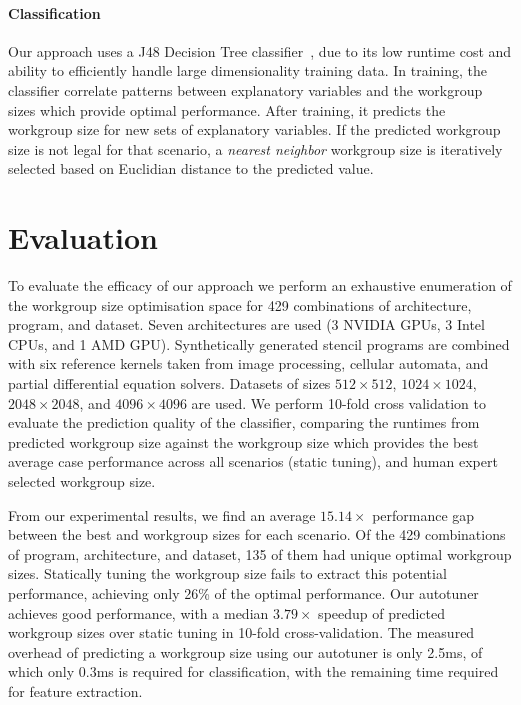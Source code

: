 \documentclass[times, 10pt,twocolumn]{article}
\begin{document}
\paragraph{Classification} Our approach uses a J48 Decision Tree
classifier~\cite{Han2011}, due to its low runtime cost and ability to
efficiently handle large dimensionality training data. In training,
the classifier correlate patterns between explanatory variables and
the workgroup sizes which provide optimal performance. After training,
it predicts the workgroup size for new sets of explanatory
variables. If the predicted workgroup size is not legal for that
scenario, a \emph{nearest neighbor} workgroup size is iteratively
selected based on Euclidian distance to the predicted value.

\section{Evaluation}

To evaluate the efficacy of our approach we perform an exhaustive
enumeration of the workgroup size optimisation space for 429
combinations of architecture, program, and dataset. Seven
architectures are used (3 NVIDIA GPUs, 3 Intel CPUs, and 1 AMD
GPU). Synthetically generated stencil programs are combined with six
reference kernels taken from image processing, cellular automata, and
partial differential equation solvers. Datasets of sizes
$512\times512$, $1024\times1024$, $2048\times2048$, and
$4096\times4096$ are used. We perform 10-fold cross validation to
evaluate the prediction quality of the classifier, comparing the
runtimes from predicted workgroup size against the workgroup size
which provides the best average case performance across all scenarios
(static tuning), and human expert selected workgroup size.


From our experimental results, we find an average $15.14\times$
performance gap between the best and workgroup sizes for each
scenario. Of the 429 combinations of program, architecture, and
dataset, 135 of them had unique optimal workgroup sizes. Statically
tuning the workgroup size fails to extract this potential performance,
achieving only 26\% of the optimal performance. Our autotuner achieves
good performance, with a median $3.79\times$ speedup of predicted
workgroup sizes over static tuning in 10-fold cross-validation. The
measured overhead of predicting a workgroup size using our autotuner
is only 2.5ms, of which only 0.3ms is required for classification,
with the remaining time required for feature extraction.
\end{document}

